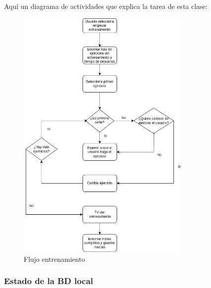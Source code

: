 Aquí un diagrama de actividades que explica la tarea de esta clase:

\begin{figure}[H]
    \centering
    \includegraphics[width=0.75\textwidth]{tablas/FlujoEntrenamiento.png}
    \caption{Flujo entrenamiento}
    \label{fig:Flujo entrenamiento}
\end{figure}

\subsubsection{Estado de la BD local}

